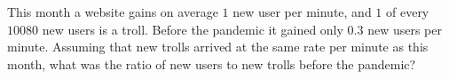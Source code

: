 This month a website gains on average $1$ new user per minute, and $1$ of every $10080$ new users is a troll. Before the pandemic it gained only $0.3$ new users per minute. Assuming that new trolls arrived at the same rate per minute as this month, what was the ratio of new users to new trolls before the pandemic?
